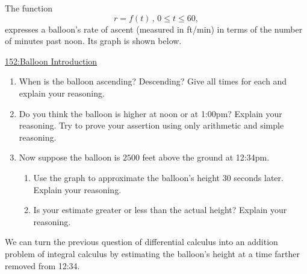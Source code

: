 \documentclass{ximera}
\begin{document}
\begin{example}  \label{Ex:98dfrghha}

The function 
\[
    r = f(t) \, , \, 0\leq t \leq  60 , 
\]
expresses a balloon's rate of ascent (measured in ft/min) in terms of the number of minutes past noon. Its graph is shown below.

\begin{onlineOnly}
    \begin{center}
\end{center}
\end{onlineOnly}

\href{https://www.desmos.com/calculator/tgi5yiuzab}{152:Balloon Introduction}

\begin{enumerate}

\item When is the balloon ascending? Descending? Give all times for each and explain your reasoning.

\item Do you think the balloon is higher at noon or at 1:00pm? Explain your reasoning. Try to prove your assertion using only arithmetic and simple reasoning.

\item Now suppose the balloon is $2500$ feet above the ground at 12:34pm. 

\begin{enumerate}

\item Use the graph to approximate the balloon's height $30$ seconds later. Explain your reasoning.

\item Is your estimate greater or less than the actual height? Explain your reasoning.

\end{enumerate}
\end{enumerate}
\end{example}

We can turn the previous question of differential calculus into an addition problem of integral calculus by estimating the balloon's height at a time farther removed from 12:34. 
\end{document}
